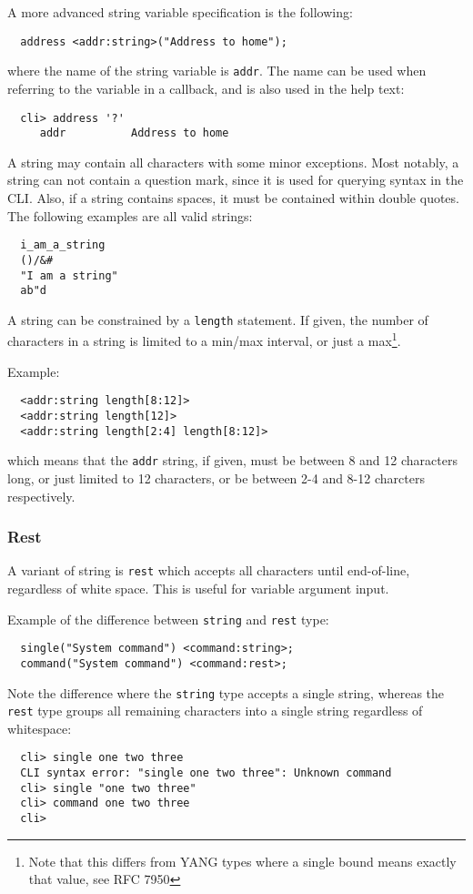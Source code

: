 \documentclass[a4paper, 10pt] {article}
\begin{document}
A more advanced string variable specification is the following:
\begin{verbatim}
  address <addr:string>("Address to home");
\end{verbatim}
where the name of the string variable is {\tt addr}. The name can be used when referring to the variable in a callback, and is also used in the help text:
\begin{verbatim}
  cli> address '?'
     addr          Address to home
\end{verbatim}

A string may contain all characters with some minor exceptions. Most
notably, a string can not contain a question mark, since it is used
for querying syntax in the CLI.  Also, if a string contains spaces, it
must be contained within double quotes.  The following examples are all valid
strings:
\begin{verbatim}
  i_am_a_string
  ()/&#
  "I am a string"
  ab"d
\end{verbatim}

A string can be constrained by a {\tt length} statement. If given, the number of characters in a string is limited to a min/max interval, or just a max\footnote{Note that this differs from YANG types where a single bound means exactly that value, see RFC 7950}.

Example:
\begin{verbatim}
  <addr:string length[8:12]>
  <addr:string length[12]>
  <addr:string length[2:4] length[8:12]>
\end{verbatim}
which means that the {\tt addr} string, if given, must be between 8 and 12 characters long, or just limited to 12 characters, or be between 2-4 and 8-12 charcters respectively.

\subsubsection{Rest}
A variant of string is {\tt rest} which accepts all characters until end-of-line, regardless of white space. This is useful for variable argument input.

Example of the difference between {\tt string} and {\tt rest} type:
\begin{verbatim}
  single("System command") <command:string>;
  command("System command") <command:rest>;
\end{verbatim}

Note the difference where the {\tt string} type accepts a single string, whereas the {\tt rest} type groups all remaining characters into a single string regardless of whitespace:
\begin{verbatim}
  cli> single one two three
  CLI syntax error: "single one two three": Unknown command
  cli> single "one two three"
  cli> command one two three
  cli>
\end{verbatim}
\end{document}
